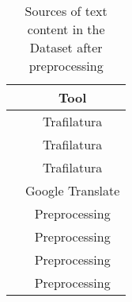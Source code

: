 \begin{table}%
    \centering
    \begin{tabular}{c|c}
       \textbf{\contentType{}}  & \textbf{Tool} \\ \hline
       \trafilaturaTitle{}  & Trafilatura \\
       \trafilaturaAbstract{}  & Trafilatura \\
       \trafilaturaFulltext{}  & Trafilatura \\
       \translationTitle{}  & Google Translate \\
     \keyphrasesAbstractOnly{} & Preprocessing \\
     \keyphrasesAbstractOC{} & Preprocessing \\
     \keyphrasesFulltextOnly{} & Preprocessing \\
     \keyphrasesFulltextOC{} & Preprocessing \\ 
    \end{tabular}
    \caption{Sources of text content in the \VSI{} Dataset after preprocessing}
    \label{tab:05_pesv_sources of content after preprocessing}
\end{table}